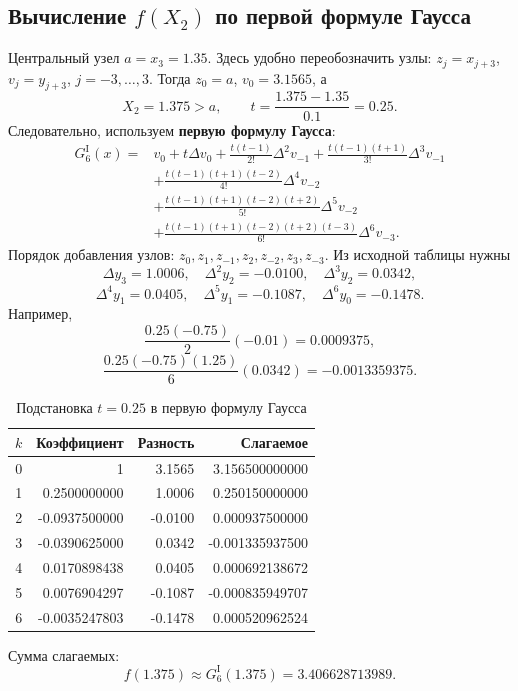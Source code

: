 \documentclass[12pt,a4paper]{article}
\begin{document}
\subsection{Вычисление $f(X_2)$ по первой формуле Гаусса}
Центральный узел $a=x_3=1.35$. Здесь удобно переобозначить узлы:
$z_j=x_{j+3}$, $v_j=y_{j+3}$, $j=-3,\ldots,3$.
Тогда $z_0=a$, $v_0=3.1565$, а
\[
X_2=1.375>a,\qquad t=\frac{1.375-1.35}{0.1}=0.25.
\]
Следовательно, используем \textbf{первую формулу Гаусса}:
\begin{align*}
G_6^{\mathrm I}(x)={}&v_0+t\Delta v_0+\frac{t(t-1)}{2!}\Delta^2v_{-1}
 +\frac{t(t-1)(t+1)}{3!}\Delta^3v_{-1}\\
&+\frac{t(t-1)(t+1)(t-2)}{4!}\Delta^4v_{-2}\\
&+\frac{t(t-1)(t+1)(t-2)(t+2)}{5!}\Delta^5v_{-2}\\
&+\frac{t(t-1)(t+1)(t-2)(t+2)(t-3)}{6!}\Delta^6v_{-3}.
\end{align*}
Порядок добавления узлов: $z_0,z_1,z_{-1},z_2,z_{-2},z_3,z_{-3}$.
Из исходной таблицы нужны
\[
\Delta y_3=1.0006,\quad \Delta^2y_2=-0.0100,\quad \Delta^3y_2=0.0342,
\]
\[
\Delta^4y_1=0.0405,\quad \Delta^5y_1=-0.1087,\quad \Delta^6y_0=-0.1478.
\]
Например,
\[
\frac{0.25(-0.75)}{2}(-0.01)=0.0009375,
\]
\[
\frac{0.25(-0.75)(1.25)}{6}(0.0342)=-0.0013359375.
\]
\begin{table}[H]
\centering
\small
\caption{Подстановка $t=0.25$ в первую формулу Гаусса}
\begin{tabular}{rrrr}
\toprule
$k$ & Коэффициент & Разность & Слагаемое \\
\midrule
0 & 1 & 3.1565 & 3.156500000000 \\
1 & 0.2500000000 & 1.0006 & 0.250150000000 \\
2 & -0.0937500000 & -0.0100 & 0.000937500000 \\
3 & -0.0390625000 & 0.0342 & -0.001335937500 \\
4 & 0.0170898438 & 0.0405 & 0.000692138672 \\
5 & 0.0076904297 & -0.1087 & -0.000835949707 \\
6 & -0.0035247803 & -0.1478 & 0.000520962524 \\
\bottomrule
\end{tabular}
\end{table}

Сумма слагаемых:
\[
\boxed{f(1.375)\approx G_6^{\mathrm I}(1.375)=3.406628713989}.
\]

\clearpage
\end{document}
